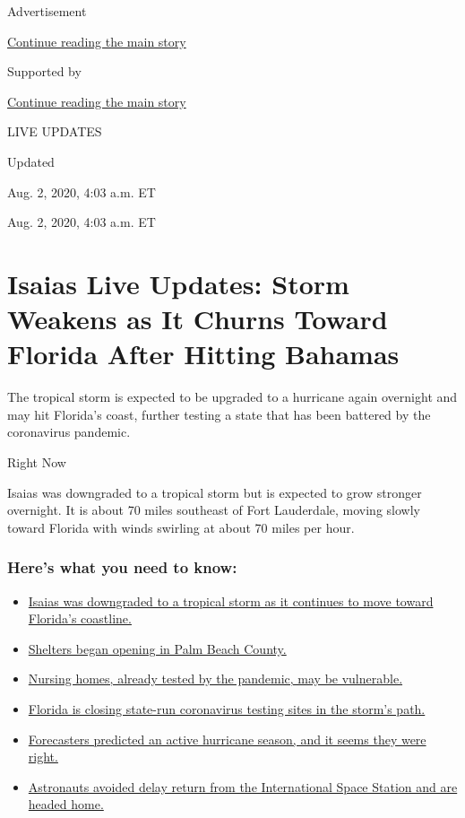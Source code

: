 Advertisement

\protect\hyperlink{after-top}{Continue reading the main story}

Supported by

\protect\hyperlink{after-sponsor}{Continue reading the main story}

LIVE UPDATES

Updated~

Aug. 2, 2020, 4:03 a.m. ET

Aug. 2, 2020, 4:03 a.m. ET

\hypertarget{isaias-live-updates-storm-weakens-as-it-churns-toward-florida-after-hitting-bahamas}{%
\section{Isaias Live Updates: Storm Weakens as It Churns Toward Florida
After Hitting
Bahamas}\label{isaias-live-updates-storm-weakens-as-it-churns-toward-florida-after-hitting-bahamas}}

The tropical storm is expected to be upgraded to a hurricane again
overnight and may hit Florida's coast, further testing a state that has
been battered by the coronavirus pandemic.

Right Now

Isaias was downgraded to a tropical storm but is expected to grow
stronger overnight. It is about 70 miles southeast of Fort Lauderdale,
moving slowly toward Florida with winds swirling at about 70 miles per
hour.

\hypertarget{heres-what-you-need-to-know}{%
\subsubsection{Here's what you need to
know:}\label{heres-what-you-need-to-know}}

\begin{itemize}
\tightlist
\item
  \protect\hyperlink{link-1ab916c}{Isaias was downgraded to a tropical
  storm as it continues to move toward Florida's coastline.}
\item
  \protect\hyperlink{link-45d987d2}{Shelters began opening in Palm Beach
  County.}
\item
  \protect\hyperlink{link-1257f12e}{Nursing homes, already tested by the
  pandemic, may be vulnerable.}
\item
  \protect\hyperlink{link-65b0758c}{Florida is closing state-run
  coronavirus testing sites in the storm's path.}
\item
  \protect\hyperlink{link-41916cd2}{Forecasters predicted an active
  hurricane season, and it seems they were right.}
\item
  \protect\hyperlink{link-5019ef0e}{Astronauts avoided delay return from
  the International Space Station and are headed home.}
\end{itemize}

